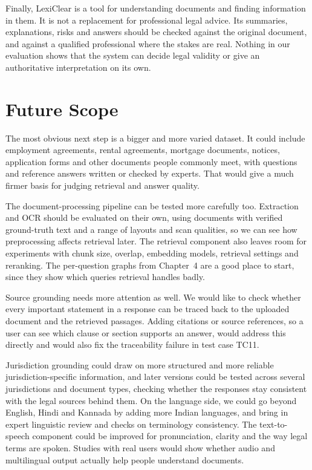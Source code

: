 \documentclass[12pt,a4paper,oneside]{report}
\begin{document}
Finally, LexiClear is a tool for understanding documents and finding information in them. It is not a replacement for professional legal advice. Its summaries, explanations, risks and answers should be checked against the original document, and against a qualified professional where the stakes are real. Nothing in our evaluation shows that the system can decide legal validity or give an authoritative interpretation on its own.

\section{Future Scope}

The most obvious next step is a bigger and more varied dataset. It could include employment agreements, rental agreements, mortgage documents, notices, application forms and other documents people commonly meet, with questions and reference answers written or checked by experts. That would give a much firmer basis for judging retrieval and answer quality.

The document-processing pipeline can be tested more carefully too. Extraction and OCR should be evaluated on their own, using documents with verified ground-truth text and a range of layouts and scan qualities, so we can see how preprocessing affects retrieval later. The retrieval component also leaves room for experiments with chunk size, overlap, embedding models, retrieval settings and reranking. The per-question graphs from Chapter~4 are a good place to start, since they show which queries retrieval handles badly.

Source grounding needs more attention as well. We would like to check whether every important statement in a response can be traced back to the uploaded document and the retrieved passages. Adding citations or source references, so a user can see which clause or section supports an answer, would address this directly and would also fix the traceability failure in test case TC11.

Jurisdiction grounding could draw on more structured and more reliable jurisdiction-specific information, and later versions could be tested across several jurisdictions and document types, checking whether the responses stay consistent with the legal sources behind them. On the language side, we could go beyond English, Hindi and Kannada by adding more Indian languages, and bring in expert linguistic review and checks on terminology consistency. The text-to-speech component could be improved for pronunciation, clarity and the way legal terms are spoken. Studies with real users would show whether audio and multilingual output actually help people understand documents.
\end{document}

